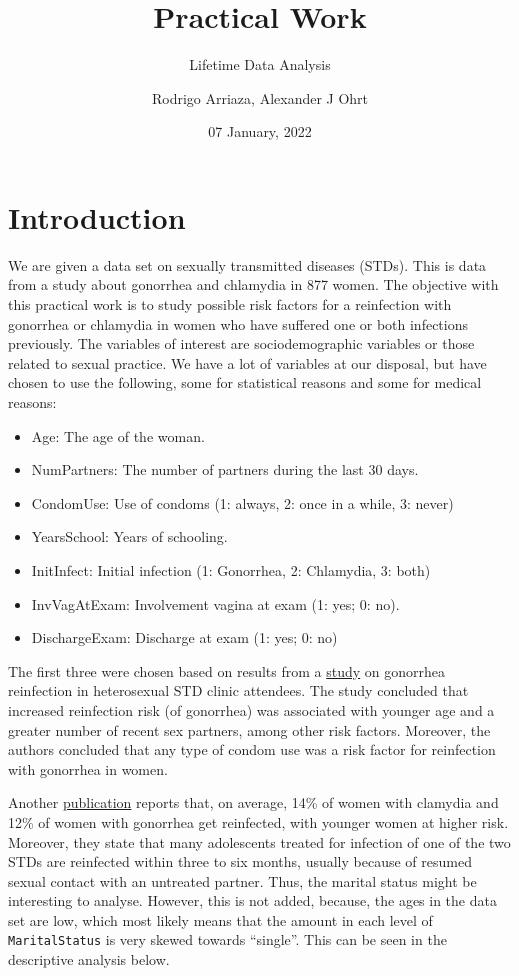 \documentclass[
]{article}
\title{Practical Work}
\subtitle{Lifetime Data Analysis}
\author{Rodrigo Arriaza, Alexander J Ohrt}
\date{07 January, 2022}
\providecommand{\tightlist}{%
  \setlength{\itemsep}{0pt}\setlength{\parskip}{0pt}}
\begin{document}
\maketitle

\hypertarget{introduction}{%
\section{Introduction}\label{introduction}}

We are given a data set on sexually transmitted diseases (STDs). This is data from a study about gonorrhea and chlamydia in 877 women. The objective with this practical work is to study possible risk factors for a reinfection with gonorrhea or chlamydia in women who have suffered one or both infections previously. The variables of interest are sociodemographic variables or those related to sexual practice. We have a lot of variables at our disposal, but have chosen to use the following, some for statistical reasons and some for medical reasons:

\begin{itemize}
\tightlist
\item
  Age: The age of the woman.
\item
  NumPartners: The number of partners during the last 30 days.
\item
  CondomUse: Use of condoms (1: always, 2: once in a while, 3: never)
\item
  YearsSchool: Years of schooling.
\item
  InitInfect: Initial infection (1: Gonorrhea, 2: Chlamydia, 3: both)
\item
  InvVagAtExam: Involvement vagina at exam (1: yes; 0: no).
\item
  DischargeExam: Discharge at exam (1: yes; 0: no)
\end{itemize}

The first three were chosen based on results from a \href{https://www.ncbi.nlm.nih.gov/pmc/articles/PMC1744639/}{study} on gonorrhea reinfection in heterosexual STD clinic attendees. The study concluded that increased reinfection risk (of gonorrhea) was associated with younger age and a greater number of recent sex partners, among other risk factors. Moreover, the authors concluded that any type of condom use was a risk factor for reinfection with gonorrhea in women.

Another \href{https://policylab.chop.edu/sites/default/files/pdf/publications/Preventing_Chlamydia_Gonorrhea_Reinfection_through_Increased_Use_of_EPT.pdf}{publication} reports that, on average, 14\% of women with clamydia and 12\% of women with gonorrhea get reinfected, with younger women at higher risk. Moreover, they state that many adolescents treated for infection of one of the two STDs are reinfected within three to six months, usually because of resumed sexual contact with an untreated partner. Thus, the marital status might be interesting to analyse. However, this is not added, because, the ages in the data set are low, which most likely means that the amount in each level of \texttt{MaritalStatus} is very skewed towards ``single''. This can be seen in the descriptive analysis below.
\end{document}
